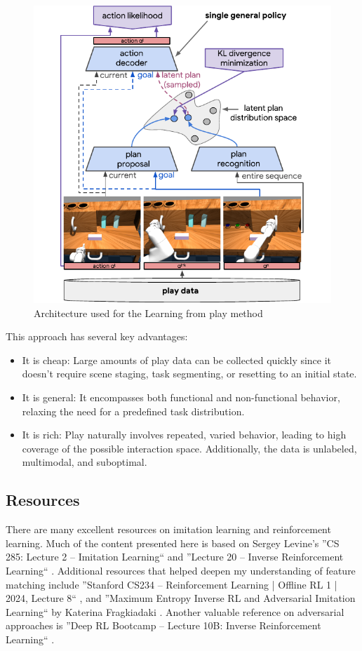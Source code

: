 \begin{figure}[H]
    \centering
    \includegraphics[height= 0.5\linewidth]{images/lmp_teaser5.pdf}
    \caption{Architecture used for the Learning from play method}
    \label{fig:LearningFromPlay}
\end{figure}


This approach has several key advantages:
\begin{itemize}
\item It is cheap: Large amounts of play data can be collected quickly since it doesn't require scene staging, task segmenting, or resetting to an initial state.
\item It is general: It encompasses both functional and non-functional behavior, relaxing the need for a predefined task distribution.
\item It is rich: Play naturally involves repeated, varied behavior, leading to high coverage of the possible interaction space. Additionally, the data is unlabeled, multimodal, and suboptimal.
\end{itemize}

\subsection{Resources}
There are many excellent resources on imitation learning and reinforcement learning. Much 
of the content presented here is based on Sergey Levine’s ''CS 285: Lecture 2 – Imitation 
Learning`` and ''Lecture 20 – Inverse Reinforcement Learning`` 
\cite{CS285,CS285LevineYoutube}. Additional resources that helped deepen my understanding 
of feature matching include ''Stanford CS234 – Reinforcement Learning | Offline RL 1 | 
2024, Lecture 8`` \cite{CS234Stanford}, and ''Maximum Entropy Inverse RL and Adversarial 
Imitation Learning`` by Katerina Fragkiadaki \cite{DeepRLandControl}. Another valuable 
reference on adversarial approaches is ''Deep RL Bootcamp – Lecture 10B: Inverse 
Reinforcement Learning`` \cite{DeepRlBootcamp}.

